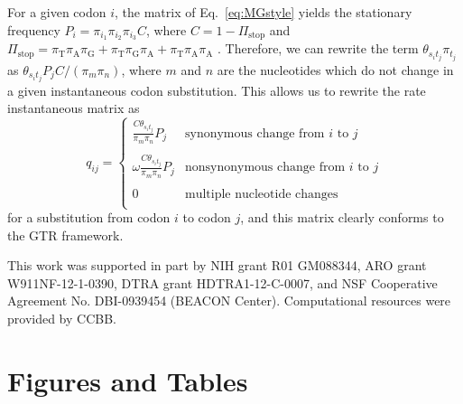 \documentclass{pnastwo}
\begin{document}
\begin{article}
For a given codon $i$, the matrix of Eq.\ \eqref{eq:MGstyle} yields the stationary frequency $P_i = \pi_{i_1}\pi_{i_2}\pi_{i_3}C$, where $C = 1 - \Pi_\text{stop}$ and $\Pi_\text{stop} = \pi_\text{T}\pi_\text{A}\pi_\text{G} + \pi_\text{T}\pi_\text{G}\pi_\text{A} + \pi_\text{T}\pi_\text{A}\pi_\text{A}$ \cite{MuseGaut1994}. Therefore, we can rewrite the term $\theta_{s_it_j}\pi_{t_j}$ as $\theta_{s_it_j}P_jC / (\pi_m\pi_n)$, where $m$ and $n$ are the nucleotides which do not change in a given instantaneous codon substitution. This allows us to rewrite the rate instantaneous matrix as 
\begin{equation}
q_{ij} = \left\{ 
\begin{array}{rl}
\frac{C\theta_{s_it_j}}{\pi_m\pi_n} P_j           &\text{synonymous change from $i$ to $j$} \\\\
\omega\frac{C\theta_{s_it_j}}{\pi_m\pi_n} P_j     &\text{nonsynonymous change from $i$ to $j$} \\\\
0                                              &\text{multiple nucleotide changes} \\           
\end{array} \right.
\end{equation} for a substitution from codon $i$ to codon $j$, and this matrix clearly conforms to the GTR framework.
		
\begin{acknowledgments}
This work was supported in part by NIH grant R01 GM088344, ARO grant W911NF-12-1-0390, DTRA grant HDTRA1-12-C-0007, and NSF Cooperative Agreement No. DBI-0939454 (BEACON Center).  Computational resources were provided by CCBB.
\end{acknowledgments}
		

		
		


		
		
\end{article}
	
	
\section*{Figures and Tables}

\vspace{2cm}
	
\end{document}
